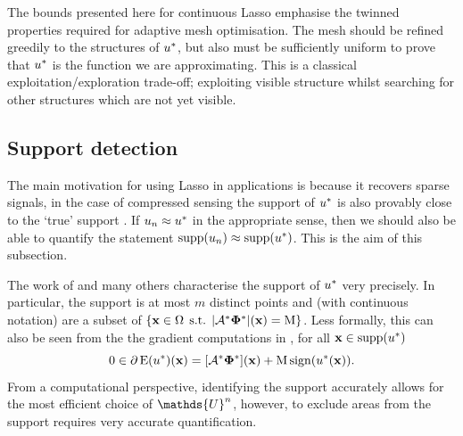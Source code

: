 \documentclass[10pt,a4paper,onecolumn]{article}
\numberwithin{equation}{section}
\let\F\mathds\let\C\mathcal\newcommand{\R}{\F{R}}\newcommand{\A}{\C{A}}
\newcommand{\op}[1]{\operatorname{#1}}\newcommand{\overtext}[2]{\stackrel{\text{#1}}{#2}}
\DeclareMathOperator{\st}{\;s.t.\;}\DeclareMathOperator{\as}{\;a.s.\;}\renewcommand{\epsilon}{\varepsilon}
\renewcommand{\vec}{\mathbf}
\newcommand{\UCmath}[1]{%
	\begingroup
	\ucmathlist\uppercase\expandafter{#1}%
	\endgroup
}
\newcommand{\ucmathlist}{%
	\def\alpha{\mathrm{A}}%
	\def\beta{\mathrm{B}}%
	\let\gamma=\Gamma
	\let\delta=\Delta
	\def\epsilon{\mathrm{E}}%
	\def\varepsilon{\mathrm{E}}%
	\def\zeta{\mathrm{Z}}%
	\def\eta{\mathrm{H}}%
	\let\theta=\Theta
	\let\vartheta=\Theta
	\def\iota{\mathrm{I}}%
	\def\kappa{\mathrm{K}}%
	\let\lambda=\Lambda
	\def\mu{\mathrm{M}}%
	\def\nu{\mathrm{N}}%
	\let\xi=\Xi
	\let\pi=\Pi
	\let\varpi=\Pi
	\def\rho{\mathrm{P}}%
	\def\varrho{\mathrm{P}}%
	\let\sigma=\Sigma
	\def\tau{\mathrm{T}}%
	\let\upsilon=\Upsilon
	\let\phi=\Phi
	\let\varphi=\Phi
	\def\chi{\mathrm{X}}%
	\let\psi=\Psi
	\let\omega=\Omega
}
\newcommand{\caps}[1]{\UCmath{#1}}
\newcommand*{\Func}[1]{%
	\IfEqCase{#1}{%
		{0}{\op{E}}%
		{1}{\op{F}}%
		{2}{\op{G}}%
		{3}{\op{H}}%
	}[\op{F}#1]%
}
\newcommand*{\varf}[1]{%
	\IfEqCase{#1}{%
		{0}{u}%
		{1}{v}%
		{2}{w}%
	}[u#1]%
}
\newcommand*{\spcf}[1]{%
	\IfEqCase{#1}{%
		{0}{\F{U}}%
		{1}{\F{V}}%
		{2}{\F{W}}%
	}[\F{U}#1]%
}
\newcommand*{\vard}[1]{%
	\IfEqCase{#1}{%
		{0}{\varphi}%
		{1}{\psi}%
	}[\varphi #1]%
}
\newcommand*{\varx}[1]{%
	\IfEqCase{#1}{%
		{0}{x}%
		{1}{y}%
		{2}{z}%
		{3}{r}%
	}[x#1]%
}
\newcommand*{\data}[1]{%
	\IfEqCase{#1}{%
		{0}{\eta}%
		{1}{\nu}%
	}[g]%
}
\newcommand{\Domain}{\Omega}
\newcommand*{\Varx}[1]{\caps{\varx{#1}}}
\newcommand*{\vvarx}[1]{\vec{\varx{#1}}}\newcommand*{\vVarx}[1]{\vec{\Varx{#1}}}
\newcommand*{\vvard}[1]{\vec{\vard{#1}}}\newcommand*{\vdata}[1]{\vec{\data{#1}}}
\begin{document}
The bounds presented here for continuous Lasso emphasise the twinned properties required for adaptive mesh optimisation. The mesh should be refined greedily to the structures of $\varf0^*$, but also must be sufficiently uniform to prove that $\varf0^*$ is the function we are approximating. This is a classical exploitation/exploration trade-off; exploiting visible structure whilst searching for other structures which are not yet visible.



\subsection{Support detection}\label{sec:ca: support detection}
The main motivation for using Lasso in applications is because it recovers sparse signals, in the case of compressed sensing the support of $\varf0^*$ is also provably close to the `true' support \cite{Duval2017a,Poon2018}. If $\varf0_n\approx \varf0^*$ in the appropriate sense, then we should also be able to quantify the statement $\op{supp}(\varf0_n)\approx\op{supp}(\varf0^*)$. This is the aim of this subsection.

The work of \cite{Duval2017a,Poon2018} and many others characterise the support of $\varf0^*$ very precisely. In particular, the support is at most $m$ distinct points and (with continuous notation) are a subset of $\{ \vvarx0\in\Domain \st |\A^*\vvard0^*|(\vvarx0) = \mu\} $. Less formally, this can also be seen from the the gradient computations in , for all $\vvarx0\in\supp(\varf0^*)$
$$0\in \partial \Func0(\varf0^*)(\vvarx0) = [\A^*\vvard0^*](\vvarx0) + \mu\sign(\varf0^*(\vvarx0)).$$
From a computational perspective, identifying the support accurately allows for the most efficient choice of $\spcf0^n$, however, to exclude areas from the support requires very accurate quantification.
\end{document}
